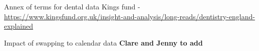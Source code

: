 \documentclass[
  8pt,
  ignorenonframetext,
  aspectratio = 169]{beamer}
\begin{document}
\begin{frame}{Annex of terms for dental data}
Kings fund -
\url{https://www.kingsfund.org.uk/insight-and-analysis/long-reads/dentistry-england-explained}
\end{frame}

\begin{frame}{Impact of swapping to calendar data}
\protect\hypertarget{impact-of-swapping-to-calendar-data}{}
\textbf{Clare and Jenny to add}
\end{frame}
\end{document}
